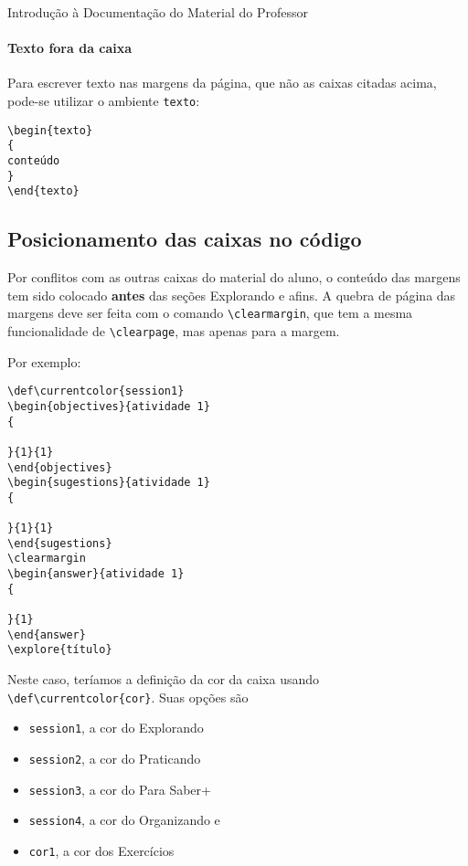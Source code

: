 \begin{apresentacao}{Introdução à Documentação do Material do Professor}
\paragraph{Texto fora da caixa}
Para escrever texto nas margens da página, que não as caixas citadas acima, pode-se utilizar o ambiente \verb|texto|:
\begin{verbatim}
\begin{texto}
{
conteúdo
}
\end{texto}
\end{verbatim}

\subsection{Posicionamento das caixas no código}

Por conflitos com as outras caixas do material do aluno, o conteúdo das margens tem sido colocado \textbf{antes} das seções Explorando e afins. A quebra de página das margens deve ser feita com o comando \verb|\clearmargin|, que tem a mesma funcionalidade de \verb|\clearpage|, mas apenas para a margem.

Por exemplo:
\begin{verbatim}
\def\currentcolor{session1}
\begin{objectives}{atividade 1}
{

}{1}{1}
\end{objectives}
\begin{sugestions}{atividade 1}
{

}{1}{1}
\end{sugestions}
\clearmargin
\begin{answer}{atividade 1}
{

}{1}
\end{answer}
\explore{título}
\end{verbatim}

Neste caso, teríamos a definição da cor da caixa usando \verb|\def\currentcolor{cor}|. Suas opções são 
\begin{itemize}
\item \verb|session1|, a cor do \textcolor{session1}{Explorando} 
\item \verb|session2|, a cor do \textcolor{session2}{Praticando}
\item \verb|session3|, a cor do \textcolor{session3}{Para Saber+}
\item \verb|session4|, a cor do \textcolor{session4}{Organizando} e
\item \verb|cor1|, a cor dos \textcolor{cor1}{Exercícios}
\end{itemize}



\end{apresentacao}
